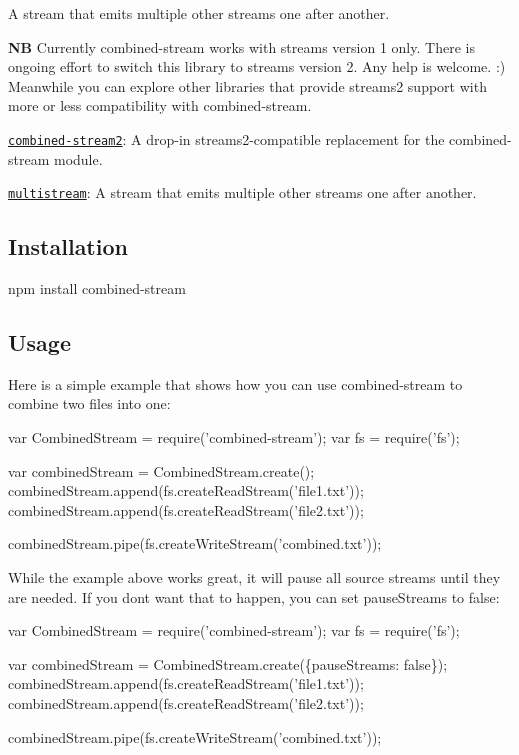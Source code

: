 A stream that emits multiple other streams one after another.

{\bfseries NB} Currently {\ttfamily combined-\/stream} works with streams version 1 only. There is ongoing effort to switch this library to streams version 2. Any help is welcome. \+:) Meanwhile you can explore other libraries that provide streams2 support with more or less compatibility with {\ttfamily combined-\/stream}.


\begin{DoxyItemize}
\item \href{https://www.npmjs.com/package/combined-stream2}{\tt combined-\/stream2}\+: A drop-\/in streams2-\/compatible replacement for the combined-\/stream module.
\item \href{https://www.npmjs.com/package/multistream}{\tt multistream}\+: A stream that emits multiple other streams one after another.
\end{DoxyItemize}

\subsection*{Installation}


\begin{DoxyCode}
npm install combined-stream
\end{DoxyCode}


\subsection*{Usage}

Here is a simple example that shows how you can use combined-\/stream to combine two files into one\+:


\begin{DoxyCode}
var CombinedStream = require('combined-stream');
var fs = require('fs');

var combinedStream = CombinedStream.create();
combinedStream.append(fs.createReadStream('file1.txt'));
combinedStream.append(fs.createReadStream('file2.txt'));

combinedStream.pipe(fs.createWriteStream('combined.txt'));
\end{DoxyCode}


While the example above works great, it will pause all source streams until they are needed. If you don\textquotesingle{}t want that to happen, you can set {\ttfamily pause\+Streams} to {\ttfamily false}\+:


\begin{DoxyCode}
var CombinedStream = require('combined-stream');
var fs = require('fs');

var combinedStream = CombinedStream.create(\{pauseStreams: false\});
combinedStream.append(fs.createReadStream('file1.txt'));
combinedStream.append(fs.createReadStream('file2.txt'));

combinedStream.pipe(fs.createWriteStream('combined.txt'));
\end{DoxyCode}


